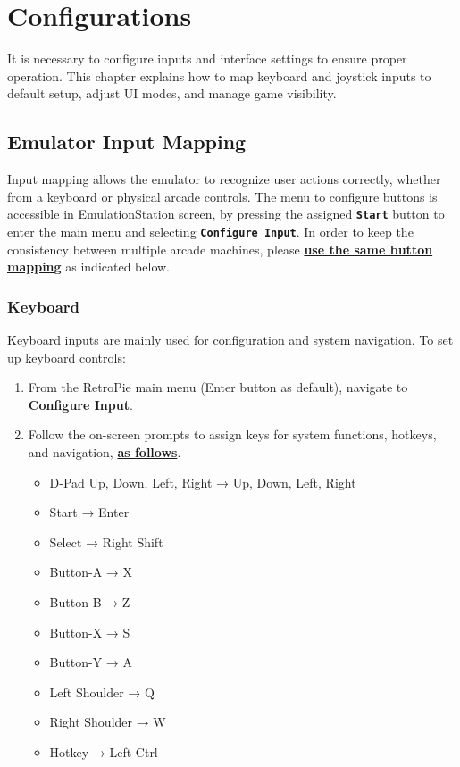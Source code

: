 \chapter{Configurations}
\label{cha:configurations}

It is necessary to configure inputs and interface settings to ensure proper operation. This chapter explains how to map keyboard and joystick inputs to default setup, adjust UI modes, and manage game visibility.

\section{Emulator Input Mapping}
\label{sec:input_mapping}

Input mapping allows the emulator to recognize user actions correctly, whether from a keyboard or physical arcade controls. The menu to configure buttons is accessible in EmulationStation screen, by pressing the assigned \textbf{\texttt{Start}} button to enter the main menu and selecting \textbf{\texttt{Configure Input}}. In order to keep the consistency between multiple arcade machines, please \underline{\textbf{use the same button mapping}} as indicated below.

\subsection{Keyboard}
\label{subsec:keyboard}

Keyboard inputs are mainly used for configuration and system navigation. To set up keyboard controls:

\begin{enumerate}
  \item From the RetroPie main menu (Enter button as default), navigate to \textbf{Configure Input}.
  \item Follow the on-screen prompts to assign keys for system functions, hotkeys, and navigation, \textbf{\underline{as follows}}.
    \begin{itemize}
      \item D-Pad Up, Down, Left, Right → Up, Down, Left, Right
      \item Start → Enter
      \item Select → Right Shift
      \item Button-A → X
      \item Button-B → Z
      \item Button-X → S
      \item Button-Y → A
      \item Left Shoulder → Q
      \item Right Shoulder → W
      \item Hotkey → Left Ctrl
    \end{itemize}
\end{enumerate}

